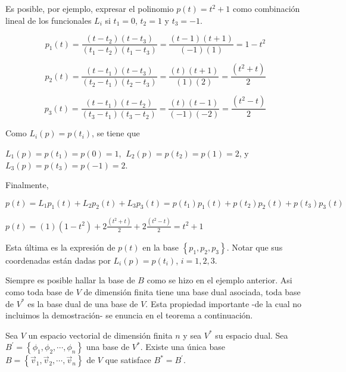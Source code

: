 \begin{example}
\bigskip

Es posible, por ejemplo,  expresar el polinomio $p(t)=t^2+1$ como combinación lineal de los funcionales $L_i$ si $t_1=0$, $t_2=1$ y $t_3=-1$.

\[
p_1(t)= \frac{(t-t_2)(t-t_3)}{(t_1-t_2)(t_1-t_3)}=\frac{(t-1)(t+1)}{(-1)(1)}=1-t^2
\]



\[p_2(t)= \frac{(t-t_1)(t-t_3)}{(t_2-t_1)(t_2-t_3)}=\frac{(t)(t+1)}{(1)(2)}=\frac{(t^2+t)}{2}\]



\[p_3(t)= \frac{(t-t_1)(t-t_2)}{(t_3-t_1)(t_3-t_2)}=\frac{(t)(t-1)}{(-1)(-2)}=\frac{(t^2-t)}{2}\]

\bigskip


Como $L_i(p)=p(t_i)$, se tiene que 

\bigskip


$L_1(p)=p(t_1)= p(0)=1$, $~L_2(p)=p(t_2)= p(1)=2$, y $ L_3(p)=p(t_3)= p(-1)=2$.

\bigskip

Finalmente,

\bigskip


$p(t)=L_1p_1(t) + L_2 p_2(t) + L_3p_3(t)= p(t_1)p_1(t) + p(t_2) p_2(t) + p(t_3) p_3(t)$

\bigskip

$p(t)= (1)(1-t^2) + 2 \frac{(t^2+t)}{2} + 2 \frac{(t^2-t)}{2}= t^2+1  $


\bigskip

Esta última es la expresión de $p(t)$ en la base $\left\{p_1,p_2, p_3 \right\}$. Notar que sus coordenadas están dadas por $L_i(p)=p(t_i)$, $i=1,2,3$.

\end{example}
\bigskip

Siempre es  posible hallar la base de $B$ como se hizo en el ejemplo anterior. Asi como toda base de $V$ de dimensión finita tiene una base dual asociada, toda base de $V^*$ es la base dual de una base de $V$. Esta   propiedad importante -de la cual no incluimos la demostración- se enuncia en el teorema a continuación.

\bigskip

\begin{corollary}
\label{basedeV}

Sea $V$ un espacio vectorial de dimensión finita $n$ y  sea $V^*$  su espacio dual.  Sea $B^{\prime}= \left\{\phi_1,\phi_2,\cdots, \phi_n\right\}$ una base de  $V^*$. Existe una única base $B= \left\{\vec{v}_1,\vec{v}_2,\cdots, \vec{v}_n\right\}$ de $V$ que satisface  $B^* = B^{\prime}  $.
\end{corollary}

